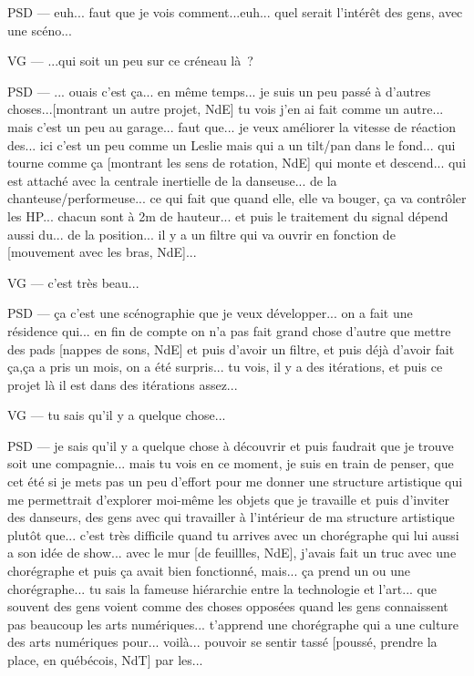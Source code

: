 PSD — euh... faut que je vois comment...euh... quel serait l'intérêt des gens, avec une scéno...

VG — ...qui soit un peu sur ce créneau là ?

PSD — ... ouais c'est ça... en même temps... je suis un peu passé à d'autres choses...[montrant un autre projet, NdE]  tu vois j'en ai fait comme un autre... mais c'est un peu au garage... faut que... je veux améliorer la vitesse de réaction des... ici c'est un peu comme un Leslie  mais qui a un tilt/pan dans le fond... qui tourne comme ça [montrant les sens de rotation, NdE] qui monte et descend... qui est attaché avec la centrale inertielle de la danseuse... de la chanteuse/performeuse... ce qui fait que quand elle, elle va bouger, ça va contrôler les HP... chacun sont à 2m de hauteur... et puis le traitement du signal dépend aussi du... de la position... il y a un filtre qui va ouvrir en fonction de [mouvement avec les bras, NdE]...

VG — c'est très beau...

PSD — ça c'est une scénographie que je veux développer... on a fait une résidence qui... en fin de compte on n'a pas fait grand chose d'autre que mettre des pads [nappes de sons, NdE] et puis d'avoir un filtre, et puis déjà d'avoir fait ça,ça a pris un mois, on a été surpris... tu vois, il y a des itérations, et puis ce projet là il est dans des itérations assez...

VG — tu sais qu'il y a quelque chose...

PSD — je sais qu'il y a quelque chose à découvrir et puis faudrait que je trouve soit une compagnie... mais tu vois en ce moment, je suis en train de penser, que cet été si je mets pas un peu d'effort pour me donner une structure artistique qui me permettrait d'explorer moi-même les objets que je travaille et puis d'inviter des danseurs, des gens avec qui travailler à l'intérieur de ma structure artistique plutôt que... c'est très difficile quand tu arrives avec un chorégraphe qui lui aussi a son idée de show... avec le mur [de feuillles, NdE], j'avais fait un truc avec une chorégraphe et puis ça avait bien fonctionné, mais... ça prend un ou une chorégraphe... tu sais la fameuse hiérarchie entre la technologie et l'art... que souvent des gens voient comme des choses opposées quand les gens connaissent pas beaucoup les arts numériques... t'apprend une chorégraphe qui a une culture des arts numériques pour... voilà... pouvoir se sentir tassé [poussé, prendre la place, en québécois, NdT]  par les...

